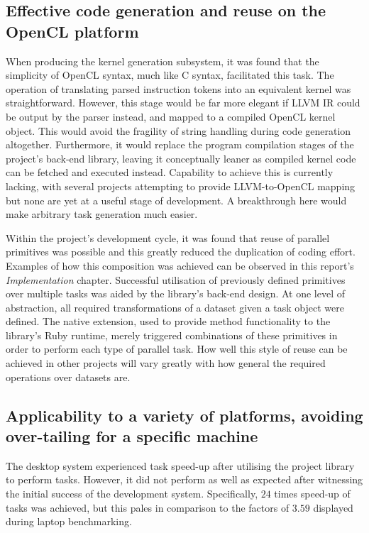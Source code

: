 \subsection{Effective code generation and reuse on the OpenCL platform}
When producing the kernel generation subsystem, it was found that the simplicity of \ac{OpenCL} syntax, much like C syntax, facilitated this task. The operation of translating parsed instruction tokens into an equivalent kernel was straightforward. However, this stage would be far more elegant if LLVM \ac{IR} could be output by the parser instead, and mapped to a compiled \ac{OpenCL} kernel object. This would avoid the fragility of string handling during code generation altogether. Furthermore, it would replace the program compilation stages of the project's back-end library, leaving it conceptually leaner as compiled kernel code can be fetched and executed instead. Capability to achieve this is currently lacking, with several projects attempting to provide LLVM-to-\ac{OpenCL} mapping but none are yet at a useful stage of development. A breakthrough here would make arbitrary task generation much easier.

Within the project's development cycle, it was found that reuse of parallel primitives was possible and this greatly reduced the duplication of coding effort. Examples of how this composition was achieved can be observed in this report's \emph{Implementation} chapter. Successful utilisation of previously defined primitives over multiple tasks was aided by the library's back-end design. At one level of abstraction, all required transformations of a dataset given a task object were defined. The native extension, used to provide method functionality to the library's Ruby runtime, merely triggered combinations of these primitives in order to perform each type of parallel task. How well this style of reuse can be achieved in other projects will vary greatly with how general the required operations over datasets are.


\subsection{Applicability to a variety of platforms, avoiding over-tailing for a specific machine}
The desktop system experienced task speed-up after utilising the project library to perform tasks. However, it did not perform as well as expected after witnessing the initial success of the development system. Specifically, $2$\textendash$4$ times speed-up of tasks was achieved, but this pales in comparison to the factors of $3.5$\textendash$9$ displayed during laptop benchmarking.


